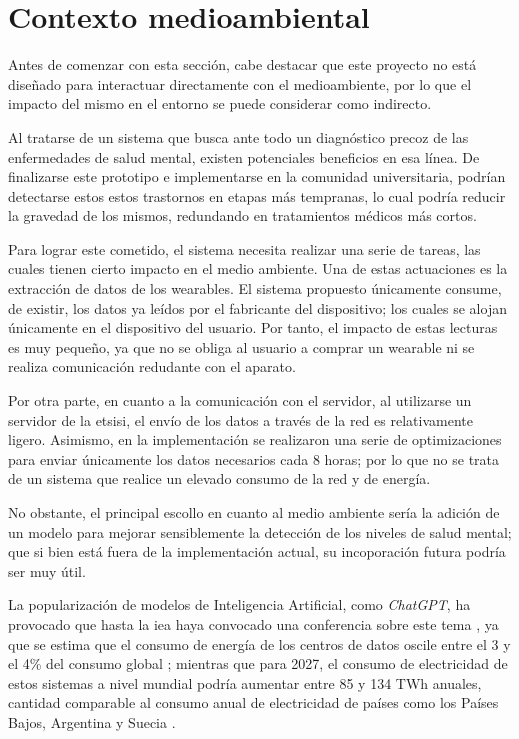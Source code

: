 \section{Contexto medioambiental}

    Antes de comenzar con esta sección, cabe destacar que este proyecto no está diseñado para interactuar directamente con el medioambiente, por lo que el impacto del mismo en el entorno se puede considerar como indirecto.

    Al tratarse de un sistema que busca ante todo un diagnóstico precoz de las enfermedades de salud mental, existen potenciales beneficios en esa línea. De finalizarse este prototipo e implementarse en la comunidad universitaria, podrían detectarse estos estos trastornos en etapas más tempranas, lo cual podría reducir la gravedad de los mismos, redundando en tratamientos médicos más cortos.

    Para lograr este cometido, el sistema necesita realizar una serie de tareas, las cuales tienen cierto impacto en el medio ambiente. Una de estas actuaciones es la extracción de datos de los \glspl{wearable}. El sistema propuesto únicamente consume, de existir, los datos ya leídos por el fabricante del dispositivo; los cuales se alojan únicamente en el dispositivo del usuario. Por tanto, el impacto de estas lecturas es muy pequeño, ya que no se obliga al usuario a comprar un \gls{wearable} ni se realiza comunicación redudante con el aparato.

    Por otra parte, en cuanto a la comunicación con el servidor, al utilizarse un servidor de la \gls{etsisi}, el envío de los datos a través de la red es relativamente ligero. Asimismo, en la implementación se realizaron una serie de optimizaciones para enviar únicamente los datos necesarios cada 8 horas; por lo que no se trata de un sistema que realice un elevado consumo de la red y de energía.

    No obstante, el principal escollo en cuanto al medio ambiente sería la adición de un modelo para mejorar sensiblemente la detección de los niveles de salud mental; que si bien está fuera de la implementación actual, su incoporación futura podría ser muy útil. 
    
    La popularización de modelos de Inteligencia Artificial, como \textit{ChatGPT}, ha provocado que hasta la \gls{iea} haya convocado una conferencia sobre este tema \cite{perez_demanda_2024}, ya que se estima que el consumo de energía de los centros de datos oscile entre el 3 y el 4\% del consumo global \cite{gijon_inteligencia_2024}; mientras que para 2027, el consumo de electricidad de estos sistemas a nivel mundial podría aumentar entre 85 y 134 TWh anuales, cantidad comparable al consumo anual de electricidad de países como los Países Bajos, Argentina y Suecia \cite{redaccion_inteligencia_2023}.
    
